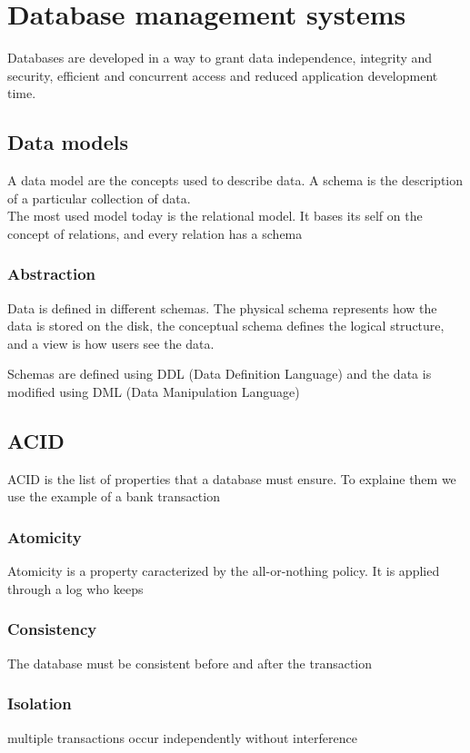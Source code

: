\documentclass[12pt, a4paper]{article}
\begin{document}
\section{Database management systems}

Databases are developed in a way to grant data independence, integrity and security, efficient and concurrent
access and reduced application development time.

\subsection{Data models}
A data model are the concepts used to describe data. A schema is the description of a particular 
collection of data.\\The most used model today is the relational model. It bases its self on the concept 
of relations, and every relation has a schema

\subsubsection{Abstraction}
Data is defined in different schemas. The physical schema represents how the data is stored on the disk,
the conceptual schema defines the logical structure, and a view is how users see the data.

Schemas are defined using DDL (Data Definition Language) and the data is modified using DML (Data 
Manipulation Language)

\subsection{ACID}
ACID is the list of properties that a database must ensure. To explaine them we use the example of a 
bank transaction

\subsubsection{Atomicity}
Atomicity is a property caracterized by the all-or-nothing policy. It is applied through a log who keeps

\subsubsection{Consistency}
The database must be consistent before and after the transaction

\subsubsection{Isolation}
multiple transactions occur independently without interference
\end{document}
